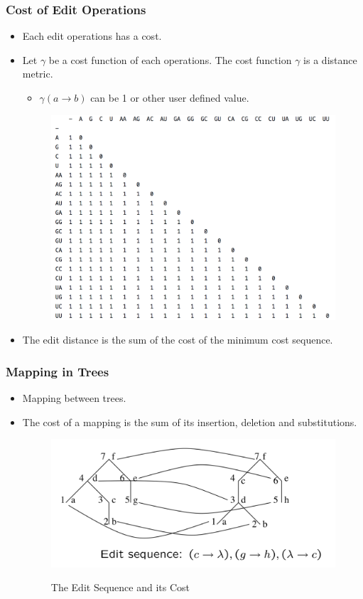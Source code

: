 \documentclass{beamer}
\begin{document}
\begin{frame}
\frametitle{Cost of Edit Operations}
\begin{itemize}
\item Each edit operations has a cost. 
\item Let $\gamma$ be a cost function of each operations. The cost function $\gamma$ is a distance metric.
\begin{itemize}
\item $\gamma(a \to b)$ can be 1 or other user defined value.
\end{itemize}
\begin{figure}
	\includegraphics[width=0.6\linewidth]{distance}
	\label{Substitution} 
	\centering
\end{figure}
\item The edit distance is the sum of the cost of the minimum cost sequence.
\end{itemize}
\end{frame}
\begin{frame}
\frametitle{Mapping in Trees}
\begin{itemize}
\item Mapping between trees.%
\item The cost of a mapping is the sum of its insertion, deletion and substitutions.
\begin{figure}
	\includegraphics[width=0.7\linewidth]{EditDistance}
	\label{Edit Sequence} 
	\caption{The Edit Sequence and its Cost}
	\centering
\end{figure}
\end{itemize}
\end{frame}
\end{document}
